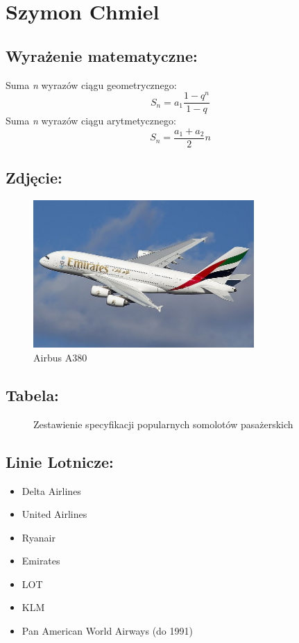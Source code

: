\newpage
\section*{Szymon Chmiel}
 \subsection*{Wyrażenie matematyczne:}
Suma \textit{n} wyrazów ciągu geometrycznego:
  \[S_n = a_1 \frac{1 - q^n}{1 - q}\]
Suma \textit{n} wyrazów ciągu arytmetycznego:
  \[S_n = \frac{a_1 + a_2}{2} n\]

 \subsection*{Zdjęcie:}
 \begin{figure}[h]
     \centering
     \includegraphics[width=0.75\textwidth]{pictures/samolot.jpg}
     \caption{Airbus A380}
     \label{fig:samolot}
 \end{figure}

 \subsection*{Tabela:}
 \begin{figure}[h]
     \centering
     
     \caption{Zestawienie specyfikacji popularnych somolotów pasażerskich}
     \label{fig:enter-label}
 \end{figure}

 \subsection*{Linie Lotnicze:}
 \begin{itemize}
     \item Delta Airlines
     \item United Airlines
     \item Ryanair
     \item Emirates
     \item LOT
     \item KLM
     \item Pan American World Airways (do 1991)
 \end{itemize}
